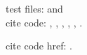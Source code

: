 \documentclass[11pt]{article}
\begin{document}
 test files:  \testC{} and \testV{}\\

 cite code: \plusUn{}, \pluslt{}, \position{}, \plusUntwice{}, \plusUnT{}, \plusUnTD{}.

 cite code href: \plusUntwiceHref{}.
\end{document}
